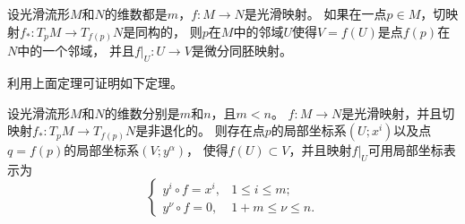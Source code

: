 \begin{theorem}\label{chdm:thm_inv-in-M}
    设光滑流形$M$和$N$的维数都是$m$，$f:M\to N$是光滑映射。
    如果在一点$p\in M$，切映射$f_{*}:T_p M\to T_{f(p)}N$是同构的，
    则$p$在$M$中的邻域$U$使得$V=f(U)$是点$f(p)$在$N$中的一个邻域，
    并且$f|_U :U\to V$是微分同胚映射。
\end{theorem}
利用上面定理可证明如下定理。
\begin{theorem}\label{chdm:thm_immerse-1}
    设光滑流形$M$和$N$的维数分别是$m$和$n$，且$m<n$。
    $f:M\to N$是光滑映射，并且切映射$f_{*}:T_p M\to T_{f(p)}N$是非退化的。
    则存在点$p$的局部坐标系$(U;x^i)$以及点$q=f(p)$的局部坐标系$(V;y^\alpha)$，
    使得$f(U)\subset V$，并且映射$f|_U$可用局部坐标表示为
    \begin{equation}
        \begin{cases}
            y^i \circ f = x^i, & 1 \leqslant i \leqslant m ; \\ 
            y^\nu \circ f = 0, & 1+m \leqslant \nu \leqslant n .
        \end{cases}
    \end{equation}
\end{theorem}
